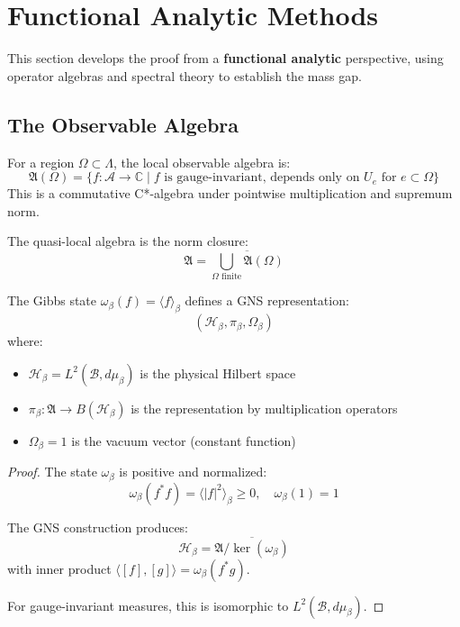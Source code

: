 \section{Functional Analytic Methods}
\label{sec:functional-analysis}

This section develops the proof from a \textbf{functional analytic} perspective, 
using operator algebras and spectral theory to establish the mass gap.

\subsection{The Observable Algebra}

\begin{definition}
For a region $\Omega \subset \Lambda$, the local observable algebra is:
\[
\mathfrak{A}(\Omega) = \{f : \mathcal{A} \to \mathbb{C} \mid f \text{ is gauge-invariant, depends only on } U_e \text{ for } e \subset \Omega\}
\]
This is a commutative C*-algebra under pointwise multiplication and supremum norm.
\end{definition}

\begin{definition}
The quasi-local algebra is the norm closure:
\[
\mathfrak{A} = \overline{\bigcup_{\Omega \text{ finite}} \mathfrak{A}(\Omega)}
\]
\end{definition}

\begin{theorem}
\label{thm:gns}
The Gibbs state $\omega_\beta(f) = \langle f \rangle_\beta$ defines a GNS representation:
\[
(\mathcal{H}_\beta, \pi_\beta, \Omega_\beta)
\]
where:
\begin{itemize}
\item $\mathcal{H}_\beta = L^2(\mathcal{B}, d\mu_\beta)$ is the physical Hilbert space
\item $\pi_\beta : \mathfrak{A} \to B(\mathcal{H}_\beta)$ is the representation by multiplication operators
\item $\Omega_\beta = 1$ is the vacuum vector (constant function)
\end{itemize}
\end{theorem}

\begin{proof}
The state $\omega_\beta$ is positive and normalized:
\[
\omega_\beta(f^* f) = \langle |f|^2 \rangle_\beta \geq 0, \quad \omega_\beta(1) = 1
\]

The GNS construction produces:
\[
\mathcal{H}_\beta = \overline{\mathfrak{A}/\ker(\omega_\beta)}
\]
with inner product $\langle [f], [g] \rangle = \omega_\beta(f^* g)$.

For gauge-invariant measures, this is isomorphic to $L^2(\mathcal{B}, d\mu_\beta)$.
\end{proof}

